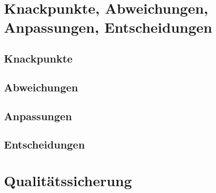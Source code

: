 \section{Knackpunkte, Abweichungen, Anpassungen, Entscheidungen}
	\subsection{Knackpunkte}
	
	\subsection{Abweichungen}
	
	\subsection{Anpassungen}
	
	\subsection{Entscheidungen}
	
\section{Qualitätssicherung}
	
	